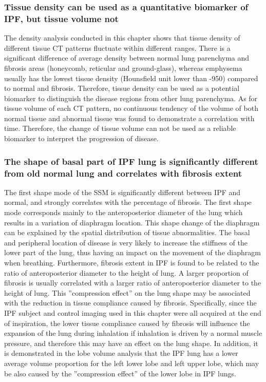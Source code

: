 \subsubsection{Tissue density can be used as a quantitative biomarker of IPF, but tissue volume not}
The density analysis conducted in this chapter shows that tissue density of different tissue CT patterns fluctuate within different ranges. There is a significant difference of average density between normal lung parenchyma and fibrosis areas (honeycomb, reticular and ground-glass), whereas emphysema usually has the lowest tissue density (Hounsfield unit lower than -950) compared to normal and fibrosis. Therefore, tissue density can be used as a potential biomarker to distinguish the disease regions from other lung parenchyma. As for tissue volume of each CT pattern, no continuous tendency of the volume of both normal tissue and abnormal tissue was found to demonstrate a correlation with time. Therefore, the change of tissue volume can not be used as a reliable biomarker to interpret the progression of disease.

\subsubsection{The shape of basal part of IPF lung is significantly different from old normal lung and correlates with fibrosis extent}
The first shape mode of the SSM is significantly different between IPF and normal, and strongly correlates with the percentage of fibrosis. The first shape mode corresponds mainly to the anteroposterior diameter of the lung which results in a variation of diaphragm location. This shape change of the diaphragm can be explained by the spatial distribution of tissue abnormalities. The basal and peripheral location of disease is very likely to increase the stiffness of the lower part of the lung, thus having an impact on the movement of the diaphragm when breathing. Furthermore, fibrosis extent in IPF is found to be related to the ratio of anteroposterior diameter to the height of lung. A larger proportion of fibrosis is usually correlated with a larger ratio of anteroposterior diameter to the height of lung. This ''compression effect'' on the lung shape may be associated with the reduction in tissue compliance caused by fibrosis. Specifically, since the IPF subject and control imaging used in this chapter were all acquired at the end of inspiration, the lower tissue compliance caused by fibrosis will influence the expansion of the lung during inhalation if inhalation is driven by a normal muscle pressure, and therefore this may have an effect on the lung shape. In addition, it is demonstrated in the lobe volume analysis that the IPF lung has a lower average volume proportion for the left lower lobe and left upper lobe, which may be also caused by the ''compression effect'' of the lower lobe in IPF lungs.

